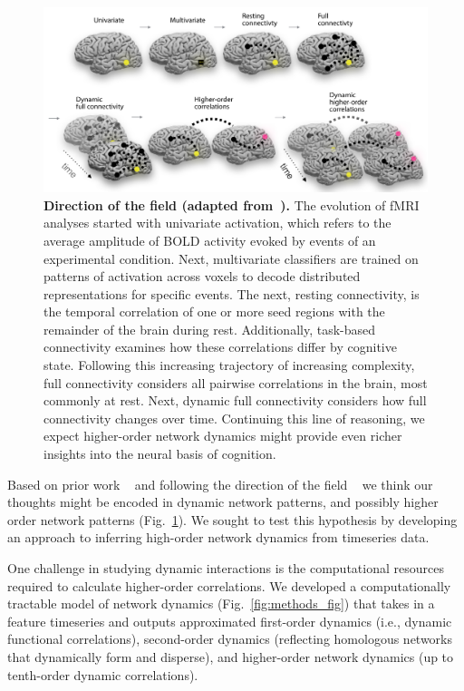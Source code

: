 \documentclass[english]{article}
\begin{document}
\begin{figure}
  \centering
  \includegraphics[width=\textwidth]{figs/direction_of_field.pdf}
  \caption{\textbf{Direction of the field (adapted from~\citep{Turk13}).} The evolution of fMRI analyses started with
    univariate activation, which refers to
    the average amplitude of BOLD activity evoked by events of an
    experimental condition. Next, multivariate classifiers are trained
    on patterns of activation across voxels to decode distributed
    representations for specific events. The next, resting
    connectivity, is the temporal correlation of one or more seed
    regions with the remainder of the brain during rest. Additionally,
    task-based connectivity examines how these correlations differ by
    cognitive state. Following this increasing trajectory of
    increasing complexity, full connectivity considers all pairwise
    correlations in the brain, most commonly at rest.  Next, dynamic
    full connectivity considers how full connectivity changes over
    time. Continuing this line of reasoning, we expect higher-order network dynamics might provide even richer insights into the neural basis of cognition.}
  \label{fig:direction_of_field}
\end{figure}



Based on prior work ~\citep{DemeEtal19} and following the direction of the field ~\citep{Turk13} we think our thoughts might be encoded in
dynamic network patterns, and possibly higher order network
patterns (Fig.~\ref{fig:direction_of_field}). We sought to test this hypothesis by developing an approach
to inferring high-order network dynamics from timeseries data. 

One challenge in studying dynamic interactions is the
computational resources required to calculate higher-order correlations. 
We developed a computationally tractable model of network dynamics (Fig.~\ref{fig:methods_fig}) that takes in a feature
timeseries and outputs approximated first-order dynamics (i.e.,
dynamic functional correlations), second-order dynamics
(reflecting homologous networks that dynamically form and disperse),
and higher-order network dynamics (up to tenth-order dynamic
correlations).
\end{document}
